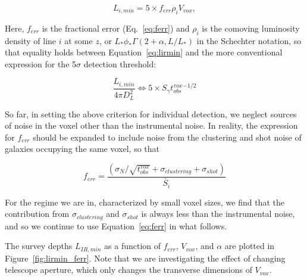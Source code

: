 \documentclass[iop]{emulateapj}
\begin{document}
\begin{equation}
L_{i, min} = 5 \times f_{err} \rho_{i} V_{vox}, 
\label{eq:lirmin}
\end{equation}

Here, $f_{err}$ is the fractional error (Eq.~\ref{eq:ferr}) and $\rho_{i}$ is the comoving luminosity density of line $i$ at some $z$, or $L_*\phi_* \Gamma(2+\alpha, L/L_*)$ in the Schechter notation, so that equality holds between Equation~\ref{eq:lirmin} and the more conventional expression for the 5$\sigma$ detection threshold:

\begin{equation}
\frac{L_{i,min}}{4\pi D_L^2} \Leftrightarrow 5 \times S_{\gamma} t_{obs}^{vox}^{-1/2}
\end{equation}

So far, in setting the above criterion for individual detection, we neglect sources of noise in the voxel other than the instrumental noise. In reality, the expression for $f_{err}$ should be expanded to include noise from the clustering and shot noise of galaxies occupying the same voxel, so that

\begin{equation}
f_{err} = \frac{(\sigma_N/\sqrt{t_{obs}^{vox}} + \sigma_{clustering} + \sigma_{shot})}{\bar{S}_i}
\end{equation}

For the regime we are in, characterized by small voxel sizes, we find that the contribution from $\sigma_{clustering}$ and $\sigma_{shot}$ is always less than the instrumental noise, and so we continue to use Equation~\ref{eq:ferr} in what follows. 

The survey depths $L_{IR,min}$ as a function of $f_{err}$, $V_{vox}$, and $\alpha$ are plotted in Figure~\ref{fig:lirmin_ferr}. Note that we are investigating the effect of changing telescope aperture, which only changes the transverse dimensions of $V_{vox}$.
\end{document}
